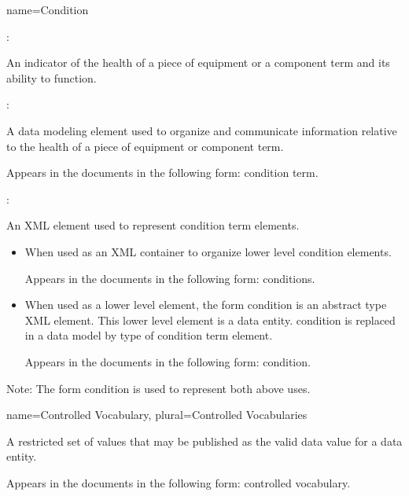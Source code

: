 {
  name={Condition}
}
{
	:

	An indicator of the health of a piece of equipment or a \gls{component term} and its ability to function.

	:

	A data modeling element used to organize and communicate information relative to the health of a piece of equipment or \gls{component term}.

	Appears in the documents in the following form: \gls{condition term}.

	:

	An XML element used to represent \gls{condition term} elements.

    \begin{itemize}
	\item When used as an XML container to organize \gls{lower level} \gls{condition} elements.

	Appears in the documents in the following form: \gls{conditions}.

	\item When used as a \gls{lower level} element, the form \gls{condition} is an abstract type XML element.  This \gls{lower level} element is a \gls{data entity}.  \gls{condition} is replaced in a data model by type of \gls{condition term} element.

	Appears in the documents in the following form: \gls{condition}.
	\end{itemize}

	Note: The form \gls{condition} is used to represent both above uses.
}


{
  name={Controlled Vocabulary},
  plural={Controlled Vocabularies}
}
{
	A restricted set of values that may be published as the \gls{valid data value} for a \gls{data entity}.

	Appears in the documents in the following form: \gls{controlled vocabulary}.
}


